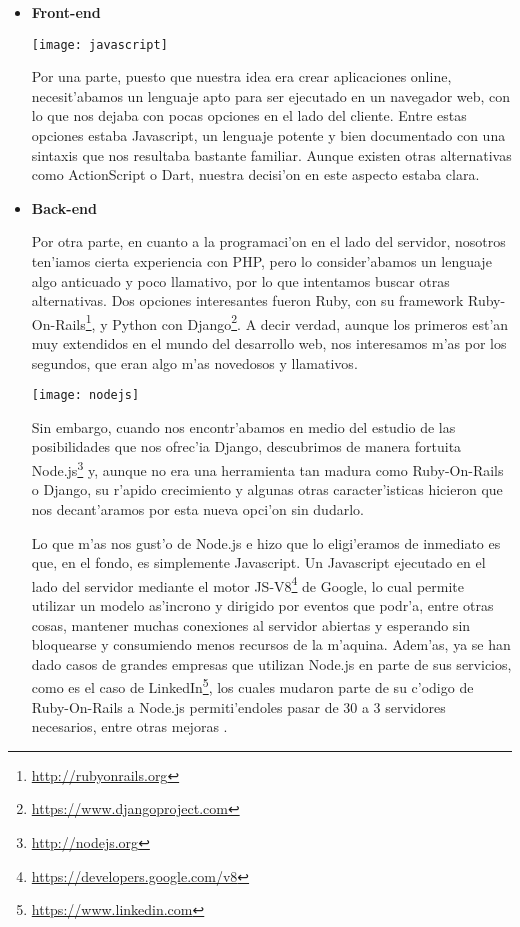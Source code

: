 \begin{itemize}
\item \textbf{Front-end}
\begin{center}
\texttt{[image: javascript]}
\end{center}

Por una parte, puesto que nuestra idea era crear aplicaciones online, necesit'abamos un
lenguaje apto para ser ejecutado en un navegador web, con lo que nos dejaba con pocas opciones en el lado del cliente. Entre estas
opciones estaba Javascript, un lenguaje potente y bien documentado con una sintaxis que nos resultaba bastante familiar. Aunque existen
otras alternativas como ActionScript o Dart, nuestra decisi'on en este aspecto estaba clara. 

\item \textbf{Back-end}

Por otra parte, en cuanto a la programaci'on en el lado del servidor, nosotros ten'iamos cierta experiencia con PHP, pero lo
consider'abamos un lenguaje algo anticuado y poco llamativo, por lo que intentamos buscar otras alternativas. Dos opciones interesantes
fueron Ruby, con su framework Ruby-On-Rails\footnote{\url{http://rubyonrails.org}}, y Python con Django\footnote{\url{https://www.djangoproject.com}}. A decir verdad, aunque los primeros est'an muy extendidos en el
mundo del desarrollo web, nos interesamos m'as por los segundos, que eran algo m'as novedosos y llamativos.

\begin{center}
\texttt{[image: nodejs]}
\end{center}

Sin embargo, cuando nos encontr'abamos en medio del estudio de las posibilidades que nos ofrec'ia Django, descubrimos de manera fortuita
Node.js\footnote{\url{http://nodejs.org}} y, aunque no era una herramienta tan madura como Ruby-On-Rails o Django, su r'apido crecimiento y algunas otras caracter'isticas
hicieron que nos decant'aramos por esta nueva opci'on sin dudarlo.

Lo que m'as nos gust'o de Node.js e hizo que lo eligi'eramos de inmediato es que, en el fondo, es simplemente Javascript. Un
Javascript ejecutado en el lado del servidor mediante el motor JS-V8\footnote{\url{https://developers.google.com/v8}} de Google, lo cual permite utilizar un modelo as'incrono y dirigido
por eventos que podr'a, entre otras cosas, mantener muchas conexiones al servidor abiertas y esperando sin bloquearse y consumiendo menos
recursos de la m'aquina. Adem'as, ya se han dado casos de grandes empresas que utilizan Node.js en parte de sus servicios, como es el caso de
LinkedIn\footnote{\url{https://www.linkedin.com}}, los cuales mudaron parte de su c'odigo de Ruby-On-Rails a Node.js permiti'endoles pasar de 30 a 3 servidores necesarios, entre otras
mejoras \cite{linkedin_nodejs} .


\end{itemize}

